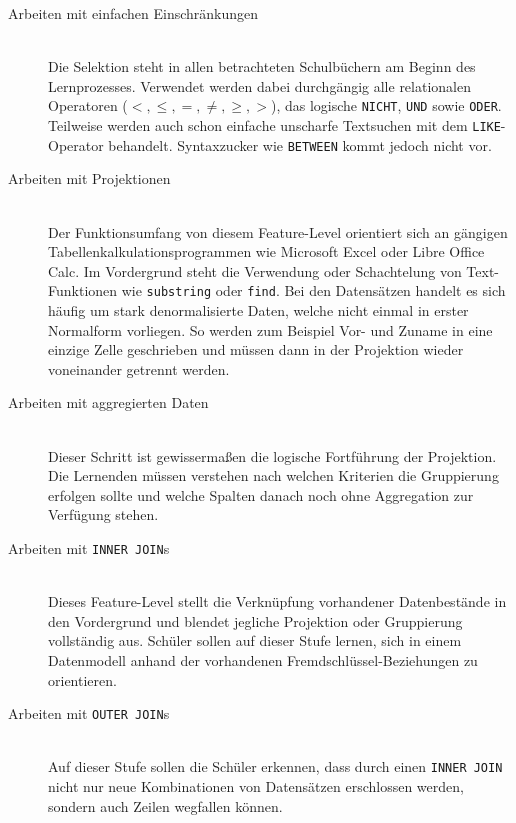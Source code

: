 \begin{description}
\item[Arbeiten mit einfachen Einschränkungen] \hfill \\
  Die Selektion steht in allen betrachteten Schulbüchern am Beginn des Lernprozesses. Verwendet werden dabei durchgängig alle relationalen Operatoren ($<, \leq, =, \neq, \geq, >$), das logische \lstinline{NICHT}, \lstinline{UND} sowie \lstinline{ODER}. Teilweise werden auch schon einfache unscharfe Textsuchen mit dem \lstinline{LIKE}-Operator behandelt. Syntaxzucker wie \lstinline{BETWEEN} kommt jedoch nicht vor.

\item[Arbeiten mit Projektionen] \hfill \\
  Der Funktionsumfang von diesem Feature-Level orientiert sich an gängigen Tabellenkalkulationsprogrammen wie Microsoft Excel oder Libre Office Calc. Im Vordergrund steht die Verwendung oder Schachtelung von Text-Funktionen wie \lstinline{substring} oder \lstinline{find}. Bei den Datensätzen handelt es sich häufig um stark denormalisierte Daten, welche nicht einmal in erster Normalform vorliegen. So werden zum Beispiel Vor- und Zuname in eine einzige Zelle geschrieben und müssen dann in der Projektion wieder voneinander getrennt werden.

\item[Arbeiten mit aggregierten Daten] \hfill \\
  Dieser Schritt ist gewissermaßen die logische Fortführung der Projektion. Die Lernenden müssen verstehen nach welchen Kriterien die Gruppierung erfolgen sollte und welche Spalten danach noch ohne Aggregation zur Verfügung stehen.

\item[Arbeiten mit \texttt{INNER JOIN}s] \hfill \\
  Dieses Feature-Level stellt die Verknüpfung vorhandener Datenbestände in den Vordergrund und blendet jegliche Projektion oder Gruppierung vollständig aus. Schüler sollen auf dieser Stufe lernen, sich in einem Datenmodell anhand der vorhandenen Fremdschlüssel-Beziehungen zu orientieren.

\item[Arbeiten mit \texttt{OUTER JOIN}s] \hfill \\
  Auf dieser Stufe sollen die Schüler erkennen, dass durch einen \texttt{INNER JOIN} nicht nur neue Kombinationen von Datensätzen erschlossen werden, sondern auch Zeilen wegfallen können.
\end{description}

